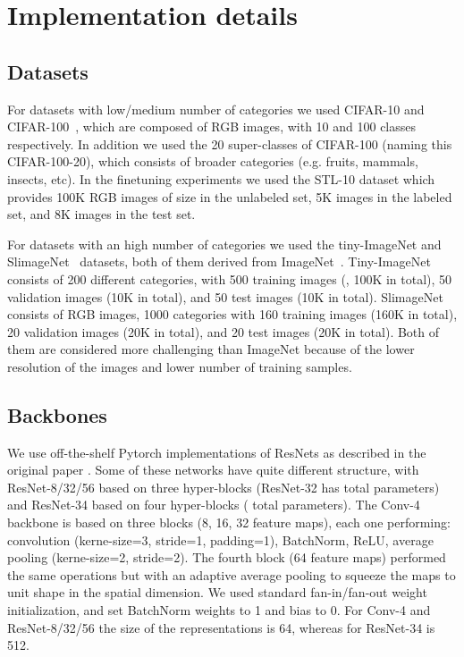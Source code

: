 \documentclass{article}
\begin{document}
\small


\FloatBarrier
\clearpage
\appendix 

\section{Implementation details}\label{appendix:implementation_details}
\FloatBarrier

\subsection{Datasets}

For datasets with low/medium number of categories we used CIFAR-10 and CIFAR-100~\citep{krizhevsky2009learning}, which are composed of  RGB images, with 10 and 100 classes respectively. In addition we used the 20 super-classes of CIFAR-100 (naming this CIFAR-100-20), which consists of broader categories (e.g. fruits, mammals, insects, etc). In the finetuning experiments we used the STL-10 dataset \citep{coates2011analysis} which provides 100K RGB images of size  in the unlabeled set, 5K images in the labeled set, and 8K images in the test set.

For datasets with an high number of categories we used the tiny-ImageNet and SlimageNet~\citep{antoniou2020defining} datasets, both of them derived from ImageNet~\citep{russakovsky2015imagenet}. Tiny-ImageNet consists of 200 different categories, with 500 training images (, 100K in total), 50 validation images (10K in total), and 50 test images (10K in total). SlimageNet consists of  RGB images, 1000 categories with 160 training images (160K in total), 20 validation images (20K in total), and 20 test images (20K in total). Both of them are considered more challenging than ImageNet because of the lower resolution of the images and lower number of training samples.

\subsection{Backbones}

We use off-the-shelf Pytorch implementations of ResNets as described in the original paper \citep{he2016deep}. Some of these networks have quite different structure, with ResNet-8/32/56 based on three hyper-blocks (ResNet-32 has  total parameters) and ResNet-34 based on four hyper-blocks ( total parameters).
The Conv-4 backbone is based on three blocks (8, 16, 32 feature maps), each one performing: convolution (kerne-size=3, stride=1, padding=1), BatchNorm, ReLU, average pooling (kerne-size=2, stride=2). The fourth block (64 feature maps) performed the same operations but with an adaptive average pooling to squeeze the maps to unit shape in the spatial dimension.
We used standard fan-in/fan-out weight initialization, and set BatchNorm weights to 1 and bias to 0. For Conv-4 and ResNet-8/32/56 the size of the representations is 64, whereas for ResNet-34 is 512.
\end{document}
